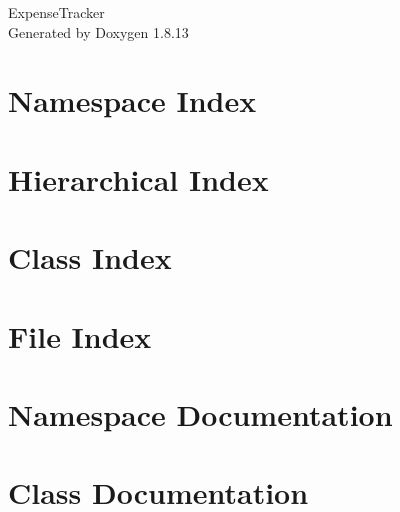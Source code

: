 \documentclass[twoside]{book}
\newcommand{\+}{\discretionary{\mbox{\scriptsize$\hookleftarrow$}}{}{}}
\newcommand{\clearemptydoublepage}{%
  \newpage{\pagestyle{empty}\cleardoublepage}%
}
\begin{document}
\hypersetup{pageanchor=false,
             bookmarksnumbered=true,
             pdfencoding=unicode
            }
\begin{titlepage}
\vspace*{7cm}
\begin{center}%
{\Large Expense\+Tracker }\\
\vspace*{1cm}
{\large Generated by Doxygen 1.8.13}\\
\end{center}
\end{titlepage}
\clearemptydoublepage
{}
\tableofcontents
\clearemptydoublepage
{}
\hypersetup{pageanchor=true}

\chapter{Namespace Index}

\chapter{Hierarchical Index}

\chapter{Class Index}

\chapter{File Index}

\chapter{Namespace Documentation}







\chapter{Class Documentation}



















\end{document}
